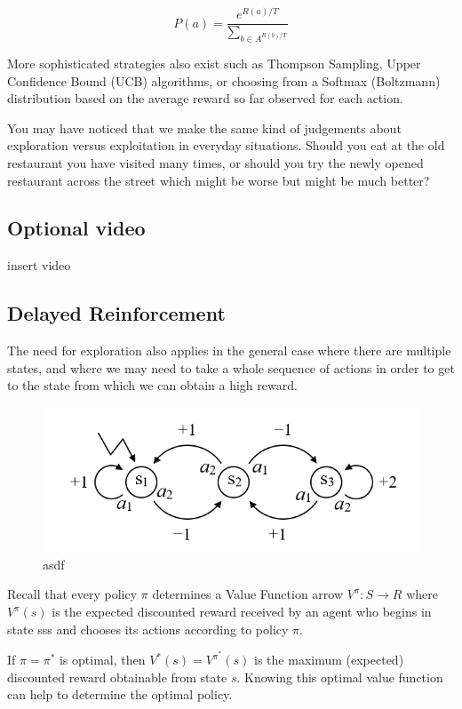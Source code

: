 \documentclass[11pt]{article}
\begin{document}
\[P(a) = \dfrac{e^{R(a)/T}}{\sum_{b \in A^{R(b)/T}}}\]

More sophisticated strategies also exist such as Thompson Sampling, Upper
Confidence Bound (UCB) algorithms, or choosing from a Softmax (Boltzmann)
distribution based on the average reward so far observed for each action.

You may have noticed that we make the same kind of judgements about exploration
versus exploitation in everyday situations.
Should you eat at the old restaurant you have visited many times, or should you
try the newly opened restaurant across the street which might be worse but
might be much better?

\subsection{Optional video}\label{subsec:optional-video3}
insert video

\subsection{Delayed Reinforcement}\label{subsec:delayed-reinforcement}
The need for exploration also applies in the general case where there are
multiple states, and where we may need to take a whole sequence of actions in
order to get to the state from which we can obtain a high reward.

\begin{figure}[h]
    \centering
    \includegraphics[width=\textwidth]{../out/images/asdf}
    \caption[asdf]{asdf}
    \label{fig:asdf}
\end{figure}

Recall that every policy $\pi$ determines a Value Function arrow
$V^{\pi}: S \to R$ where $V^{\pi}(s)$ is the expected discounted reward
received by an agent who begins in state sss and chooses its actions according
to policy $\pi$.

If $\pi = \pi^*$ is optimal, then $V^* (s) = V^{\pi^*}(s)$ is the maximum
(expected) discounted reward obtainable from state $s$.
Knowing this optimal value function can help to determine the optimal policy.
\end{document}
